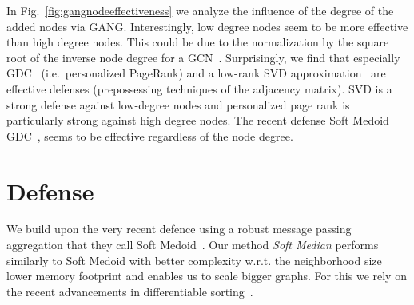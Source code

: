 \documentclass[sigconf,authordraft]{acmart}
\begin{document}
In Fig.~\ref{fig:gangnodeeffectiveness} we analyze the influence of the degree of the added nodes via GANG. Interestingly, low degree nodes seem to be more effective than high degree nodes. This could be due to the normalization by the square root of the inverse node degree for a GCN~\cite{Kipf2017}. Surprisingly, we find that especially GDC~\cite{Klicpera2019a} (i.e.~personalized PageRank) and a low-rank SVD approximation~\cite{Entezari2020} are effective defenses (prepossessing techniques of the adjacency matrix). SVD is a strong defense against low-degree nodes and personalized page rank is particularly strong against high degree nodes. The recent defense Soft Medoid GDC~\citep{Geisler2020}, seems to be effective regardless of the node degree.

\section{Defense}

We build upon the very recent defence using a robust message passing aggregation that they call Soft Medoid~\citet{Geisler2020}. Our method \emph{Soft Median} performs similarly to Soft Medoid with better complexity w.r.t. the neighborhood size lower memory footprint and enables us to scale bigger graphs. For this we rely on the recent advancements in differentiable sorting~\citet{Prillo2020}.
\end{document}
